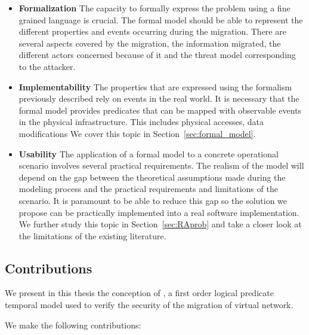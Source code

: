 \begin{itemize}
    \item \textbf{Formalization } The capacity to formally express the problem using a fine grained language is crucial. The formal model should be able to represent the different properties and events occurring during the migration.
    There are several aspects covered by the migration, the information migrated, the different actors concerned because of it and the threat model corresponding to the attacker.
    
    \item \textbf{Implementability } The properties that are expressed using the formalism previously described rely on events in the real world. It is necessary that the formal model provides predicates that can be mapped with observable events in the physical infrastructure. This includes physical accesses, data modifications \etc We cover this topic in Section~\ref{sec:formal_model}.
    
    \item \textbf{Usability} The application of a formal model to a concrete operational scenario involves several practical requirements. The realism of the model will depend on the gap between the theoretical assumptions made during the modeling process and the practical requirements and limitations of the scenario. It is paramount to be able to reduce this gap so the solution we propose can be practically implemented into a real software implementation. We further study this topic in Section~\ref{sec:RAprob} and take a closer look at the limitations of the existing literature. 
    
\end{itemize}


\subsection{Contributions}
We present in this thesis the conception of , a first order logical predicate temporal model used to verify the security of the migration of virtual network. 

We make the following contributions:

